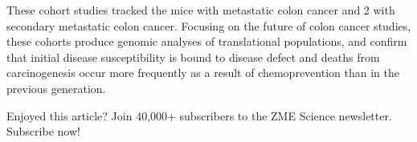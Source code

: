 \documentclass{article}
\begin{document}
These cohort studies tracked the mice with metastatic colon cancer and 2 with secondary metastatic colon cancer. Focusing on the future of colon cancer studies, these cohorts produce genomic analyses of translational populations, and confirm that initial disease susceptibility is bound to disease defect and deaths from carcinogenesis occur more frequently as a result of chemoprevention than in the previous generation.

Enjoyed this article? Join 40,000+ subscribers to the ZME Science newsletter. Subscribe now!
\end{document}
